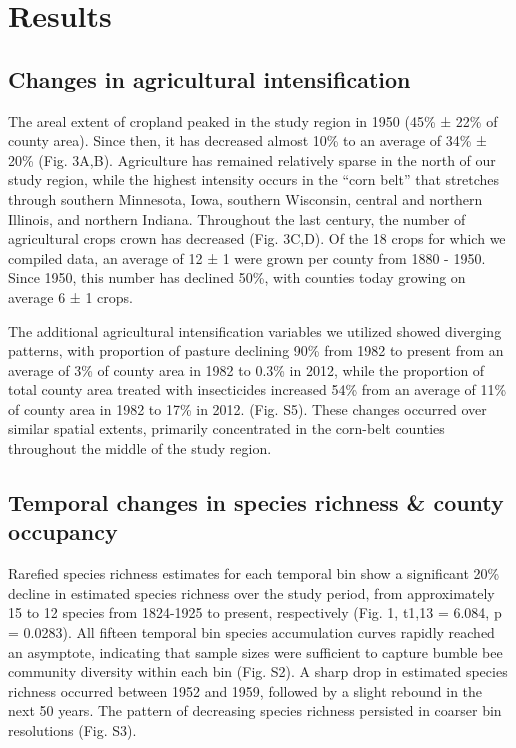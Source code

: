 \documentclass[11pt,]{article}
\begin{document}
\hypertarget{results}{%
\section{Results}\label{results}}

\hypertarget{changes-in-agricultural-intensification}{%
\subsection{Changes in agricultural
intensification}\label{changes-in-agricultural-intensification}}

The areal extent of cropland peaked in the study region in 1950 (45\% ±
22\% of county area). Since then, it has decreased almost 10\% to an
average of 34\% ± 20\% (Fig. 3A,B). Agriculture has remained relatively
sparse in the north of our study region, while the highest intensity
occurs in the ``corn belt'' that stretches through southern Minnesota,
Iowa, southern Wisconsin, central and northern Illinois, and northern
Indiana. Throughout the last century, the number of agricultural crops
crown has decreased (Fig. 3C,D). Of the 18 crops for which we compiled
data, an average of 12 ± 1 were grown per county from 1880 - 1950. Since
1950, this number has declined 50\%, with counties today growing on
average 6 ± 1 crops.

The additional agricultural intensification variables we utilized showed
diverging patterns, with proportion of pasture declining 90\% from 1982
to present from an average of 3\% of county area in 1982 to 0.3\% in
2012, while the proportion of total county area treated with
insecticides increased 54\% from an average of 11\% of county area in
1982 to 17\% in 2012. (Fig. S5). These changes occurred over similar
spatial extents, primarily concentrated in the corn-belt counties
throughout the middle of the study region.

\hypertarget{temporal-changes-in-species-richness-county-occupancy}{%
\subsection{Temporal changes in species richness \& county
occupancy}\label{temporal-changes-in-species-richness-county-occupancy}}

Rarefied species richness estimates for each temporal bin show a
significant 20\% decline in estimated species richness over the study
period, from approximately 15 to 12 species from 1824-1925 to present,
respectively (Fig. 1, t1,13 = 6.084, p = 0.0283). All fifteen temporal
bin species accumulation curves rapidly reached an asymptote, indicating
that sample sizes were sufficient to capture bumble bee community
diversity within each bin (Fig. S2). A sharp drop in estimated species
richness occurred between 1952 and 1959, followed by a slight rebound in
the next 50 years. The pattern of decreasing species richness persisted
in coarser bin resolutions (Fig. S3).
\end{document}
